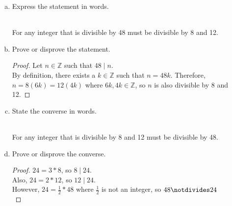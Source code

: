 \documentclass[12pt]{amsart}
\begin{document}
\begin{enumerate}[{\bfseries 1.}]
	\begin{enumerate}[(a)]
	\vspace{0.1in}
	\item Express the statement in words.
	\begin{normalize}
    \vspace{0.1in}
    \\For any integer that is divisible by 48 must be divisible by 8 and 12.
    \\
    \end{normalize}
	\item Prove or disprove the statement.
	\begin{normalize}
    \vspace{0.1in}
    \begin{proof}  
    Let $n\in\mathbb{Z}$ such that $48\mid n$.
    \\By definition, there exists a $k\in\mathbb{Z}$ such that $n = 48k$. Therefore, $n = 8(6k) = 12(4k)$ where $6k, 4k\in\mathbb{Z}$, so $n$ is also divisible by 8 and 12.
    \end{proof}
    \end{normalize}
	\vfill
	\vfill
	\item State the converse in words.
	\begin{normalize}
    \vspace{0.1in}
    \\For any integer that is divisible by 8 and 12 must be divisible by 48.
    \\
    \end{normalize}
	\item Prove or disprove the converse.
	\begin{normalize}
    \vspace{0.1in}
    \begin{proof}  
    $24 = 3*8$, so $8\mid 24$.
    \\Also, $24= 2*12$, so $12\mid 24$.
    \\However, $24 = \frac{1}{2}*48$ where $\frac{1}{2}$ is not an integer, so $48\notdivides 24$ 
    \\
    \end{proof}
    \end{normalize}
	\vfill
	\vfill
	\end{enumerate}
\end{enumerate}
\end{document}
